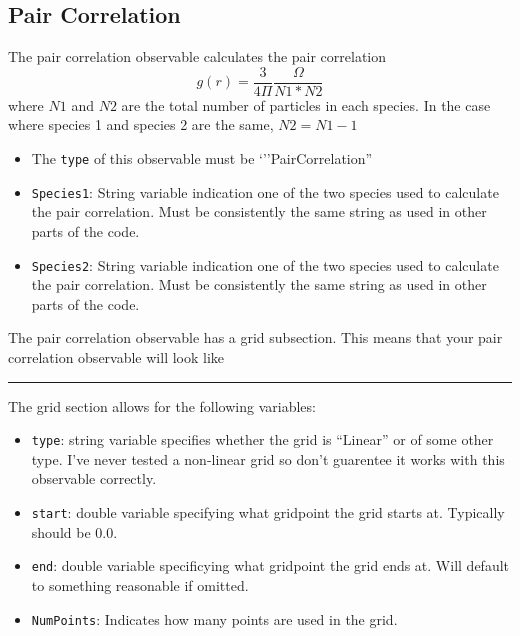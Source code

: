 \documentclass{book}
\begin{document}
\subsection{Pair Correlation}
The pair correlation observable calculates the pair correlation   
$$g(r)=\frac{3}{4\Pi}\frac{\Omega}{N1*N2}$$ where $N1$ and $N2$ are
the total number of particles in each species. In the case where
species 1 and species 2 are the same, $N2=N1-1$ 
\begin{itemize}
\item The \texttt{type} of this observable must be
`''PairCorrelation''
\item \texttt{Species1}: String variable indication one of the two species used to calculate the
  pair correlation. Must be consistently the same string as used in
  other parts of the code.
\item \texttt{Species2}: String variable indication one of the two species used to calculate the
  pair correlation. Must be consistently the same string as used in
  other parts of the code.
\end{itemize}
The pair correlation observable has a grid subsection. This means that
your pair correlation observable will look like
\rule{0.6cm}{0cm}
The grid section allows for the following variables:
\begin{itemize}
\item \texttt{type}: string variable specifies whether the grid is
  ``Linear'' or of some other type. I've never tested a non-linear
  grid so don't guarentee it works with this observable correctly.
\item \texttt{start}: double variable specifying what gridpoint the grid
  starts at. Typically should be 0.0.
\item \texttt{end}: double variable specificying what gridpoint the
  grid ends at. Will default to something reasonable if omitted.
\item \texttt{NumPoints}: Indicates how many points are used in the grid.
\end{itemize}
\end{document}
